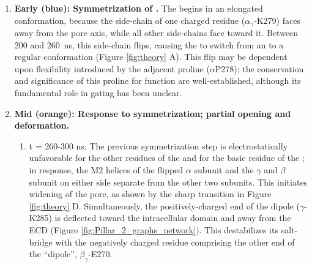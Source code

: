 \documentclass[9pt,twocolumn,twoside,lineno]{pnas-new}
\begin{document}
\begin{enumerate}
\item {\bf Early  (blue): Symmetrization of \fiveringnos.} The \fivering begins in an elongated conformation, because the side-chain of one charged residue ($\alpha_{\gamma}$-K279) faces away from the pore axis, while all other side-chains face toward it. Between 200 and 260~ns, this side-chain flips, causing the \fivering to switch from an \extended to a regular conformation (Figure \ref{fig:theory} A).  This flip may be dependent upon flexibility introduced by the adjacent proline ($\alpha$P278); the conservation\cite{Jaiteh2016} and significance of this proline for function\cite{Lummis2005} are well-established, although its fundamental role in gating has been unclear. %
\item {\bf Mid  (orange): Response to symmetrization; partial opening and deformation.}
\begin{enumerate}
\item t = 260-300 ns: The previous symmetrization step is electrostatically unfavorable for the other residues of the \fivering and for the basic residue of the \triadns; in response,  the M2 helices of the flipped $\alpha$ subunit and the $\gamma$ and $\beta$ subunit on either side separate from the other two subunits. This initiates widening of the pore, as shown by the sharp transition in Figure \ref{fig:theory} D.   Simultaneously, the positively-charged end of the \triad dipole ($\gamma$-K285) is deflected toward the intracellular domain and away from the ECD (Figure \ref{fig:Pillar_2_graphs_network}). This destabilizes its salt-bridge with the negatively charged residue comprising the other end of the ``dipole'', $\beta_{\gamma}$-E270.  


\end{enumerate}
\end{enumerate}
\end{document}

